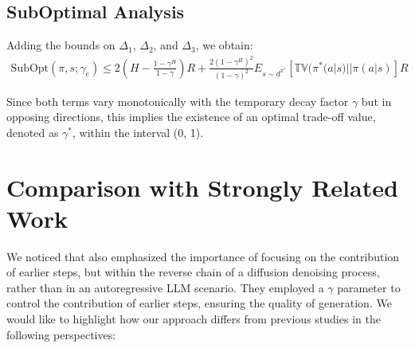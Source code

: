 


\subsection{SubOptimal Analysis}

Adding the bounds on $\Delta_1$, $\Delta_2$, and $\Delta_3$, we obtain:
\begin{align}
\text{SubOpt}(\pi,s; \gamma_e) \leq 2(H - \frac{1-\gamma^H}{1-\gamma})R + \frac{2(1-\gamma^H)^2}{(1-\gamma)^2}E_{s \sim d^{\pi^{*}}}\left[\mathbb{TV}(\pi^*(a|s)||\pi(a|s)\right]R
\end{align}

Since both terms vary monotonically with the temporary decay factor $\gamma$ but in opposing directions, this implies the existence of an optimal trade-off value, denoted as $\gamma^{*}$, within the interval (0, 1).




\section{Comparison with Strongly Related Work}
\label{appendxi:comparison_with_related_work}

We noticed that \citet{yang2024denseReward} also emphasized the importance of focusing on the contribution of earlier steps, but within the reverse chain of a diffusion denoising process, rather than in an autoregressive LLM scenario. They employed a $\gamma$ parameter to control the contribution of earlier steps, ensuring the quality of generation. We would like to highlight how our approach differs from previous studies in the following perspectives:

